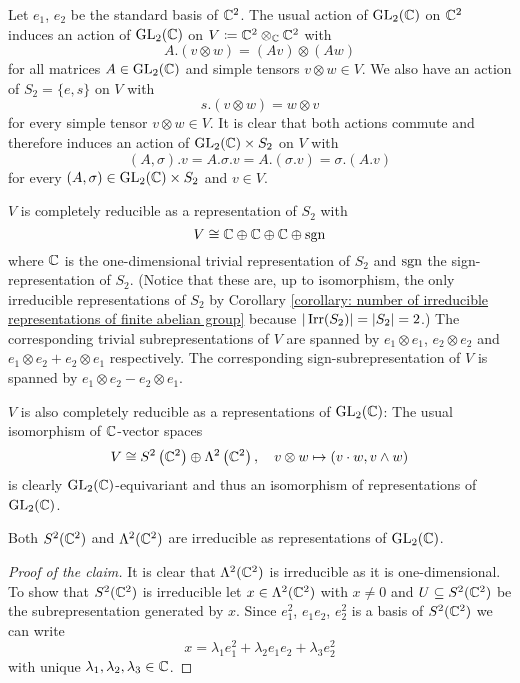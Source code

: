 \begin{example}
Let $e_1$, $e_2$ be the standard basis of $\mathbb{C}^2$.
The usual action of $\operatorname{GL}_2(\mathbb{C})$ on $\mathbb{C}^2$ induces an action of $\operatorname{GL}_2(\mathbb{C})$ on $V \coloneqq \mathbb{C}^2 \otimes_{\mathbb{C}} \mathbb{C}^2$ with
  \[
      A.(v \otimes w)
    = (Av) \otimes (Aw)
  \]
  for all matrices $A \in \operatorname{GL}_2(\mathbb{C})$ and simple tensors $v \otimes w \in V$.
  We also have an action of $S_2 = \{e, s\}$ on $V$ with
  \[
      s.(v \otimes w)
    = w \otimes v
  \]
  for every simple tensor $v \otimes w \in V$.
  It is clear that both actions commute and therefore induces an action of $\operatorname{GL}_2(\mathbb{C}) \times S_2$ on $V$ with
  \[
      (A,\sigma).v
    = A.\sigma.v
    = A.(\sigma.v)
    = \sigma.(A.v)
  \]
  for every $(A,\sigma) \in \operatorname{GL}_2(\mathbb{C}) \times S_2$ and $v \in V$.
  
  $V$ is completely reducible as a representation of $S_2$ with
  \[
                  V
    \cong         \mathbb{C}
          \oplus  \mathbb{C}
          \oplus  \mathbb{C}
          \oplus  \operatorname{sgn}
  \]
  where $\mathbb{C}$ is the one-dimensional trivial representation of $S_2$ and $\operatorname{sgn}$ the sign-representation of $S_2$.
  (Notice that these are, up to isomorphism, the only irreducible representations of $S_2$ by Corollary \ref{corollary: number of irreducible representations of finite abelian group} because $|\operatorname{Irr}(S_2)| = |S_2| = 2$.)
  The corresponding trivial subrepresentations of $V$ are spanned by $e_1 \otimes e_1$, $e_2 \otimes e_2$ and $e_1 \otimes e_2 + e_2 \otimes e_1$ respectively.
  The corresponding sign-subrepresentation of $V$ is spanned by $e_1 \otimes e_2 - e_2 \otimes e_1$.
  
  $V$ is also completely reducible as a representations of $\operatorname{GL}_2(\mathbb{C})$:
  The usual isomorphism of $\mathbb{C}$-vector spaces
  \[
            V
    \cong   S^2\left( \mathbb{C}^2 \right)  \oplus  \Lambda^2\left( \mathbb{C}^2 \right),
    \quad   v \otimes w
    \mapsto (v \cdot w, v \wedge w)
  \]
  is clearly $\operatorname{GL}_2(\mathbb{C})$-equivariant and thus an isomorphism of representations of $\operatorname{GL}_2(\mathbb{C})$.
  
  \begin{claim}
    Both $S^2(\mathbb{C}^2)$ and $\Lambda^2(\mathbb{C}^2)$ are irreducible as representations of $\operatorname{GL}_2(\mathbb{C})$.
  \end{claim}
  \begin{proof}[Proof of the claim]
    It is clear that $\Lambda^2(\mathbb{C}^2)$ is irreducible as it is one-dimensional.
    To show that $S^2(\mathbb{C}^2)$ is irreducible let $x \in \Lambda^2(\mathbb{C}^2)$ with $x \neq 0$ and $U \subseteq S^2(\mathbb{C}^2)$ be the subrepresentation generated by $x$.
    Since $e_1^2$, $e_1 e_2$, $e_2^2$ is a basis of $S^2(\mathbb{C}^2)$ we can write
    \[
        x
      =   \lambda_1 e_1^2
        + \lambda_2 e_1 e_2
        + \lambda_3 e_2^2
    \]
    with unique $\lambda_1, \lambda_2, \lambda_3 \in \mathbb{C}$.
    

\end{proof}
\end{example}
